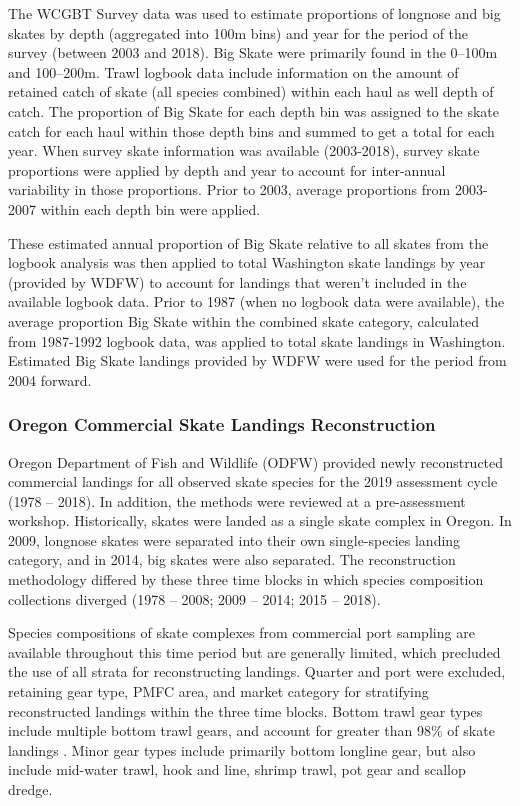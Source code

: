 \documentclass[12pt,]{article}
\begin{document}
The WCGBT Survey data was used to estimate proportions of longnose and
big skates by depth (aggregated into 100m bins) and year for the period
of the survey (between 2003 and 2018). Big Skate were primarily found in
the 0--100m and 100--200m. Trawl logbook data include information on the
amount of retained catch of skate (all species combined) within each
haul as well depth of catch. The proportion of Big Skate for each depth
bin was assigned to the skate catch for each haul within those depth
bins and summed to get a total for each year. When survey skate
information was available (2003-2018), survey skate proportions were
applied by depth and year to account for inter-annual variability in
those proportions. Prior to 2003, average proportions from 2003-2007
within each depth bin were applied.

These estimated annual proportion of Big Skate relative to all skates
from the logbook analysis was then applied to total Washington skate
landings by year (provided by WDFW) to account for landings that weren't
included in the available logbook data. Prior to 1987 (when no logbook
data were available), the average proportion Big Skate within the
combined skate category, calculated from 1987-1992 logbook data, was
applied to total skate landings in Washington. Estimated Big Skate
landings provided by WDFW were used for the period from 2004 forward.

\hypertarget{oregon-commercial-skate-landings-reconstruction}{%
\subsubsection{Oregon Commercial Skate Landings
Reconstruction}\label{oregon-commercial-skate-landings-reconstruction}}

Oregon Department of Fish and Wildlife (ODFW) provided newly
reconstructed commercial landings for all observed skate species for the
2019 assessment cycle (1978 -- 2018). In addition, the methods were
reviewed at a pre-assessment workshop. Historically, skates were landed
as a single skate complex in Oregon. In 2009, longnose skates were
separated into their own single-species landing category, and in 2014,
big skates were also separated. The reconstruction methodology differed
by these three time blocks in which species composition collections
diverged (1978 -- 2008; 2009 -- 2014; 2015 -- 2018).

Species compositions of skate complexes from commercial port sampling
are available throughout this time period but are generally limited,
which precluded the use of all strata for reconstructing landings.
Quarter and port were excluded, retaining gear type, PMFC area, and
market category for stratifying reconstructed landings within the three
time blocks. Bottom trawl gear types include multiple bottom trawl
gears, and account for greater than 98\% of skate landings . Minor gear
types include primarily bottom longline gear, but also include mid-water
trawl, hook and line, shrimp trawl, pot gear and scallop dredge.
\end{document}
